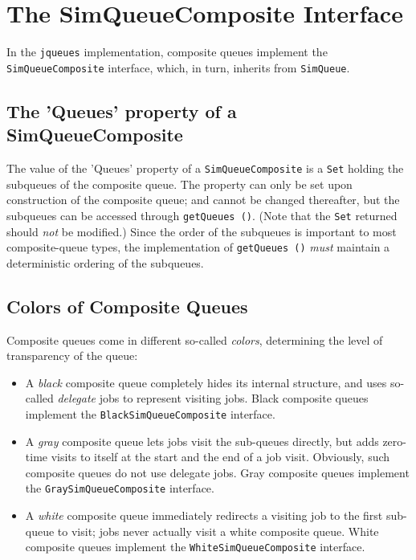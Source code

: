 \documentclass[12pt]{book}
\begin{document}
\section{The SimQueueComposite Interface}

In the \lstinline|jqueues| implementation,
  composite queues implement the \lstinline|SimQueueComposite| interface,
  which, in turn, inherits from \lstinline|SimQueue|.

\subsection{The 'Queues' property of a SimQueueComposite}

The value of the 'Queues' property of a \lstinline|SimQueueComposite|
  is a \lstinline|Set| holding the subqueues of the composite queue.
The property can only be set upon construction of the composite queue;
  and cannot be changed thereafter,
  but the subqueues can be accessed through \lstinline|getQueues ()|.
(Note that the \lstinline|Set| returned should {\em not\/} be modified.)
Since the order of the subqueues is important to most composite-queue types,
  the implementation of \lstinline|getQueues ()| {\em must\/} maintain
  a deterministic ordering of the subqueues.
  
\subsection{Colors of Composite Queues}

Composite queues come in different so-called {\em colors},
  determining the level of transparency of the queue:
\begin{itemize}
\item A {\em black\/} composite queue completely hides its internal structure,
        and uses so-called {\em delegate\/} jobs
        to represent visiting jobs.
      Black composite queues implement the \lstinline|BlackSimQueueComposite| interface.
\item A {\em gray\/} composite queue lets jobs visit the sub-queues directly,
        but adds zero-time visits to itself at the start and the end of a job visit.
      Obviously, such composite queues do not use delegate jobs.
      Gray composite queues implement the \lstinline|GraySimQueueComposite| interface.
\item A {\em white\/} composite queue immediately redirects a visiting job to the first sub-queue to visit;
        jobs never actually visit a white composite queue.
      White composite queues implement the \lstinline|WhiteSimQueueComposite| interface.
\end{itemize}
\end{document}
